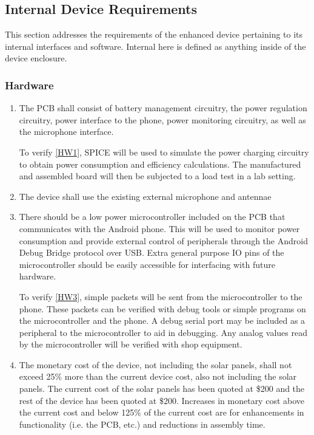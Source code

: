 \documentclass{article}
\begin{document}
{\subsection{Internal Device Requirements}
This section addresses the requirements of the enhanced device pertaining to its internal interfaces and software. Internal here is defined as anything inside of the device enclosure.
\subsubsection{Hardware}
\begin{enumerate}[align=left,leftmargin=*, labelindent= 0em, label=\textbf{Requirement \thesubsubsection.\arabic*.}, itemindent=0em]
\item \label{HW1}The PCB shall consist of battery management circuitry, the power regulation circuitry, power interface to the phone, power monitoring circuitry, as well as the microphone interface.

\baselinestretch
To verify \ref{HW1}, SPICE will be used to simulate the power charging circuitry to obtain power consumption and efficiency calculations. The manufactured and assembled board will then be subjected to a load test in a lab setting.

\item \label{HW2}The device shall use the existing external microphone and antennae
\item \label{HW3}There should be a low power microcontroller included on the PCB that communicates with the Android phone. This will be used to monitor power consumption and provide external control of peripherals through the Android Debug Bridge protocol over USB. Extra general purpose IO pins of the microcontroller should be easily accessible for interfacing with future hardware.

\baselinestretch
To verify \ref{HW3}, simple packets will be sent from the microcontroller to the phone. These packets can be verified with debug tools or simple programs on the microcontroller and the phone. A debug serial port may be included as a peripheral to the microcontroller to aid in debugging. Any analog values read by the microcontroller will be verified with shop equipment.

\item \label{HW4} The monetary cost of the device, not including the solar panels, shall not exceed 25\% more than the current device cost, also not including the solar panels. The current cost of the solar panels has been quoted at \$200 and the rest of the device has been quoted at \$200. Increases in monetary cost above the current cost and below 125\% of the current cost are for enhancements in functionality (i.e. the PCB, etc.) and reductions in assembly time.


\end{enumerate}}
\end{document}
